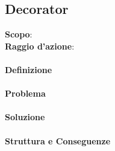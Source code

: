 \subsection{Decorator}


\textbf{Scopo}:  \\
\textbf{Raggio d'azione}: 

\paragraph{Definizione}

\paragraph{Problema}

\paragraph{Soluzione} 

\paragraph{Struttura e Conseguenze} 

\newpage